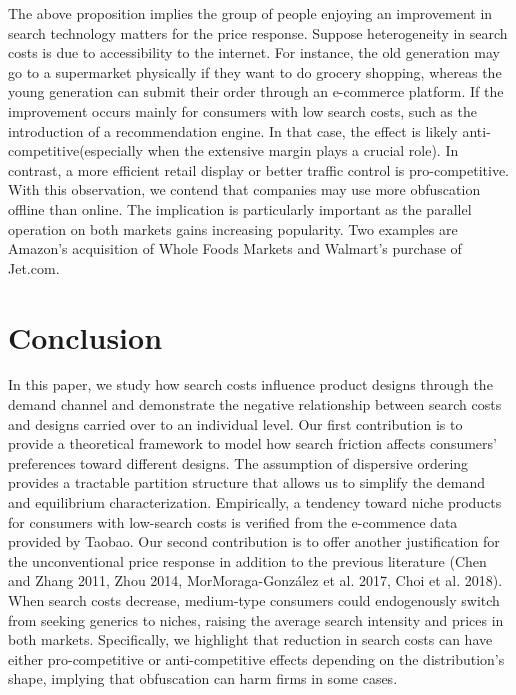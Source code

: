 \documentclass[14pt]{article}
\theoremstyle{plain}
\theoremstyle{definition}
\theoremstyle{remark}
\DeclareRobustCommand\1{\futurelet\oneNext\oneCheck}
\begin{document}
The above proposition implies the group of people enjoying an improvement in search technology matters for the price response. Suppose heterogeneity in search costs is due to accessibility to the internet. For instance, the old generation may go to a supermarket physically if they want to do grocery shopping, whereas the young generation can submit their order through an e-commerce platform. If the improvement occurs mainly for consumers with low search costs, such as the introduction of a recommendation engine. In that case, the effect is likely anti-competitive(especially when the extensive margin plays a crucial role). In contrast, a more efficient retail display or better traffic control is pro-competitive. With this observation, we contend that companies may use more obfuscation offline than online. The implication is particularly important as the parallel operation on both markets gains increasing popularity. Two examples are Amazon's acquisition of Whole Foods Markets and Walmart's purchase of Jet.com.



\section{Conclusion}\label{section:conclusion}
In this paper, we study how search costs influence product designs through the demand channel and demonstrate the negative relationship between search costs and designs carried over to an individual level. Our first contribution is to provide a theoretical framework to model how search friction affects consumers' preferences toward different designs. The assumption of dispersive ordering provides a tractable partition structure that allows us to simplify the demand and equilibrium characterization. Empirically, a tendency toward niche products for consumers with low-search costs is verified from the e-commence data provided by Taobao. Our second contribution is to offer another justification for the unconventional price response in addition to the previous literature (Chen and Zhang 2011, Zhou 2014, MorMoraga-Gonz{\' a}lez et al. 2017, Choi et al. 2018). When search costs decrease, medium-type consumers could endogenously switch from seeking generics to niches, raising the average search intensity and prices in both markets. Specifically, we highlight that reduction in search costs can have either pro-competitive or anti-competitive effects depending on the distribution's shape, implying that obfuscation can harm firms in some cases.
\end{document}
